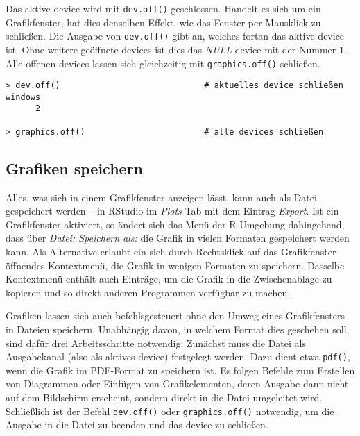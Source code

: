Das aktive device wird mit \lstinline!dev.off()! geschlossen. Handelt es sich um ein Grafikfenster, hat dies denselben Effekt, wie das Fenster per Mausklick zu schließen. Die Ausgabe von \lstinline!dev.off()! gibt an, welches fortan das aktive device ist. Ohne weitere geöffnete devices ist dies das \emph{NULL}-device mit der Nummer $1$. Alle offenen devices lassen sich gleichzeitig mit \lstinline!graphics.off()! schließen.
\begin{lstlisting}
> dev.off()                             # aktuelles device schließen
windows
      2

> graphics.off()                        # alle devices schließen
\end{lstlisting}

\subsection{Grafiken speichern}
\label{sec:saveDiag}

Alles, was sich in einem Grafikfenster anzeigen lässt, kann auch als Datei gespeichert werden -- in RStudio im \emph{Plots}-Tab mit dem Eintrag \emph{Export}. Ist ein Grafikfenster aktiviert, so ändert sich das Menü der R-Umgebung dahingehend, dass über \emph{Datei: Speichern als:} die Grafik in vielen Formaten gespeichert werden kann. Als Alternative erlaubt ein sich durch Rechtsklick auf das Grafikfenster öffnendes Kontextmenü, die Grafik in wenigen Formaten zu speichern. Dasselbe Kontextmenü enthält auch Einträge, um die Grafik in die Zwischenablage zu kopieren und so direkt anderen Programmen verfügbar zu machen.

Grafiken lassen sich auch befehlsgesteuert ohne den Umweg eines Grafikfensters in Dateien speichern. Unabhängig davon, in welchem Format dies geschehen soll, sind dafür drei Arbeitsschritte notwendig: Zunächst muss die Datei als Ausgabekanal (also als aktives device) festgelegt werden. Dazu dient etwa \lstinline!pdf()!, wenn die Grafik im PDF-Format zu speichern ist. Es folgen Befehle zum Erstellen von Diagrammen oder Einfügen von Grafikelementen, deren Ausgabe dann nicht auf dem Bildschirm erscheint, sondern direkt in die Datei umgeleitet wird. Schließlich ist der Befehl \lstinline!dev.off()! oder \lstinline!graphics.off()! notwendig, um die Ausgabe in die Datei zu beenden und das device zu schließen.

